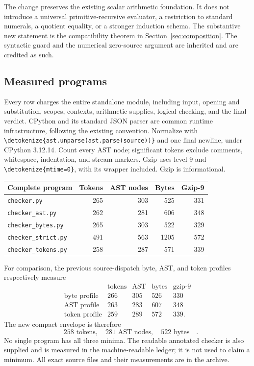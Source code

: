 \documentclass[11pt,letterpaper]{article}
\theoremstyle{definition}\newtheorem{definition}[theorem]{Definition}
\theoremstyle{remark}\newtheorem{remark}[theorem]{Remark}
\newcommand{\file}[1]{\expandafter\nolinkurl\expandafter{\detokenize{#1}}}
\begin{document}
The change preserves the existing scalar arithmetic foundation. It does
not introduce a universal primitive-recursive evaluator, a restriction to
standard numerals, a quotient equality, or a stronger induction schema.
The substantive new statement is the compatibility theorem in
Section~\ref{sec:composition}. The syntactic guard and the numerical
zero-source argument are inherited and are credited as such.

\subsection{Measured programs}

Every row charges the entire standalone module, including input, opening
and substitution, scopes, contexts, arithmetic supplies, logical checking,
and the final verdict. CPython and its standard JSON parser are common
runtime infrastructure, following the existing convention. Normalize with
\file{ast.unparse(ast.parse(source))} and one final newline, under CPython
3.12.14. Count every AST node; significant tokens exclude comments,
whitespace, indentation, and stream markers. Gzip uses level 9 and
\file{mtime=0}, with its wrapper included. Gzip is informational.

\begin{center}\small

\begin{tabular}{lrrrr}
\toprule
Complete program & Tokens & AST nodes & Bytes & Gzip-9\\
\midrule
\texttt{checker.py} & 265 & 303 & 525 & 331\\
\texttt{checker\_ast.py} & 262 & 281 & 606 & 348\\
\texttt{checker\_bytes.py} & 265 & 303 & 522 & 329\\
\texttt{checker\_strict.py} & 491 & 563 & 1205 & 572\\
\texttt{checker\_tokens.py} & 258 & 287 & 571 & 339\\
\bottomrule
\end{tabular}


\end{center}

For comparison, the previous source-dispatch byte, AST, and token profiles
respectively measure
\[
\begin{array}{c|rrrr}
 &\text{tokens}&\text{AST}&\text{bytes}&\text{gzip-9}\\\hline
\text{byte profile}&266&305&526&330\\
\text{AST profile}&263&283&607&348\\
\text{token profile}&259&289&572&339.
\end{array}
\]
The new compact envelope is therefore
\[
\boxed{\quad258\text{ tokens},\quad281\text{ AST nodes},\quad522\text{ bytes}\quad}.
\]
No single program has all three minima. The readable annotated checker is
also supplied and is measured in the machine-readable ledger; it is not
used to claim a minimum. All exact source files and their measurements are
in the archive.
\end{document}
